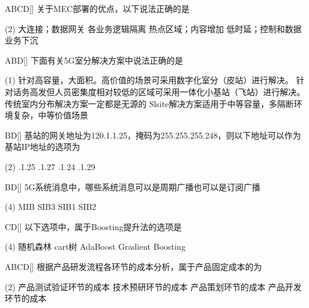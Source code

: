 \begin{choice}{\;ABCD\;}[]
	关于MEC部署的优点，以下说法正确的是
	\begin{tasks}(2)
		\task 大连接；数据网关
		\task 各业务逻辑隔离
		\task 热点区域；内容增加
		\task 低时延；控制和数据业务下沉
	\end{tasks}
\end{choice}

\begin{choice}{\;ABD\;}[]
	下面有关5G室分解决方案中说法正确的是
	\begin{tasks}(1)
		\task 针对高容量，大面积。高价值的场景可采用数字化室分（皮站）进行解决。
		\task 针对话务高发但人员密集度相对较低的区域可采用一体化小基站（飞站）进行解决。
		\task 传统室内分布解决方案一定都是无源的
		\task Slsite解决方案适用于中等容量，多隔断环境复杂，中等价值场景
	\end{tasks}
\end{choice}


\begin{choice}{\;BD\;}[]
	基站的网关地址为120.1.1.25，掩码为255.255.255.248，则以下地址可以作为基站IP地址的选项为
	\begin{tasks}(2)
		.1.25
		.1.27
		.1.24
		.1.29
	\end{tasks}
\end{choice}

\begin{choice}{\;BD\;}[]
	5G系统消息中，哪些系统消息可以是周期广播也可以是订阅广播
	\begin{tasks}(4)
		\task MIB
		\task SIB3
		\task SIB1
		\task SIB2
	\end{tasks}
\end{choice}


\begin{choice}{\;CD\;}[]
	以下选项中，属于Boosting提升法的选项是
	\begin{tasks}(4)
		\task 随机森林
		\task cart树
		\task AdaBoost
		\task Gradient Boosting
	\end{tasks}
\end{choice}


\begin{choice}{\;ABCD\;}[]
	根据产品研发流程各环节的成本分析，属于产品固定成本的为
	\begin{tasks}(2)
		\task 产品测试验证环节的成本
		\task 技术预研环节的成本
		\task 产品策划环节的成本
		\task 产品开发环节的成本
	\end{tasks}
\end{choice}

